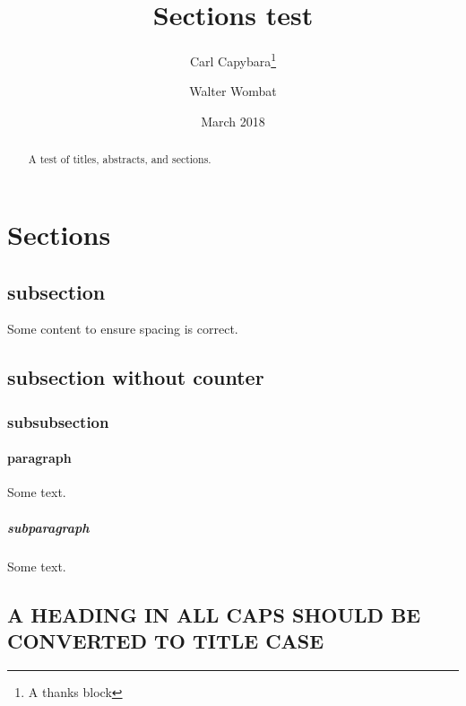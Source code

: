 \documentclass{article}
\begin{document}
  \title{Sections test}
  \author{Carl Capybara\thanks{A thanks block} \and Walter Wombat}
  \date{March 2018}
  \maketitle
  \begin{abstract}
    A test of titles, abstracts, and sections.
  \end{abstract}
  \section{Sections}

  \subsection{subsection}

  Some content to ensure spacing is correct.

  \subsection*{subsection without counter}

  \subsubsection{subsubsection}

  \paragraph{paragraph}

  Some text.

  \subparagraph{subparagraph}

  Some text.

  \subsection{A HEADING IN ALL CAPS SHOULD BE CONVERTED TO TITLE CASE}
\end{document}
